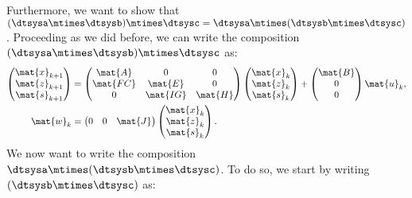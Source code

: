 Furthermore, we want to show that~$(\dtsysa\mtimes \dtsysb)\mtimes \dtsysc=\dtsysa\mtimes (\dtsysb\mtimes \dtsysc)$.
Proceeding as we did before, we can write the composition~$(\dtsysa\mtimes \dtsysb)\mtimes \dtsysc$ as:
\begin{equation*}
    \label{eq:dlin-5}
    \begin{aligned}
        \begin{pmatrix}
            \mat{x}_{k+1} \\
            \mat{z}_{k+1} \\
            \mat{s}_{k+1}
        \end{pmatrix} & =
        \begin{pmatrix}
            \mat{A}  & 0        & 0       \\
            \mat{FC} & \mat{E}  & 0       \\
            0        & \mat{IG} & \mat{H}
        \end{pmatrix}\begin{pmatrix}
                         \mat{x}_k \\ \mat{z}_k\\ \mat{s}_k
                     \end{pmatrix}+
        \begin{pmatrix}
            \mat{B} \\ 0\\ 0
        \end{pmatrix}\mat{u}_k,                                                             \\
        \mat{w}_k                         & =\begin{pmatrix}
                                                 0 & 0 & \mat{J}
                                             \end{pmatrix}\begin{pmatrix}
                                                              \mat{x}_k \\ \mat{z}_k\\ \mat{s}_k
                                                          \end{pmatrix}.
    \end{aligned}
\end{equation*}
We now want to write the composition~$\dtsysa\mtimes (\dtsysb\mtimes \dtsysc)$.
To do so, we start by writing~$(\dtsysb\mtimes \dtsysc)$ as:
